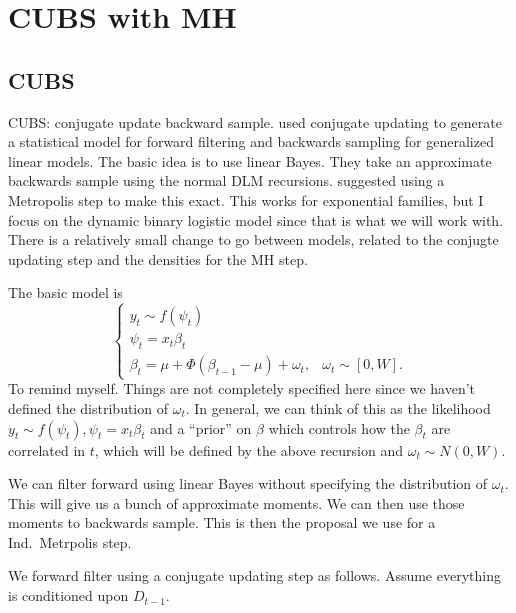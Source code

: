 \documentclass{article}
\begin{document}
\section{CUBS with MH}

\subsection{CUBS}

CUBS: conjugate update backward sample.  \cite{west-etal-1985} used conjugate
updating to generate a statistical model for forward filtering and backwards
sampling for generalized linear models.  The basic idea is to use linear Bayes.
They take an approximate backwards sample using the normal DLM recursions.
\cite{ravines-etal-2006} suggested using a Metropolis step to make this exact.
This works for exponential families, but I focus on the dynamic binary logistic
model since that is what we will work with.  There is a relatively small change
to go between models, related to the conjugte updating step and the densities
for the MH step.

The basic model is
\[
\begin{cases}
y_t \sim f(\psi_t) \\
\psi_t = x_t \beta_t \\
\beta_t = \mu + \Phi( \beta_{t-1} - \mu ) + \omega_t, & \omega_t \sim [0, W].
\end{cases}
\]
To remind myself.  Things are not completely specified here since we haven't
defined the distribution of $\omega_t$.  In general, we can think of this as the
likelihood $y_t \sim f(\psi_t), \psi_t = x_t \beta_t$ and a ``prior'' on $\beta$
which controls how the $\beta_t$ are correlated in $t$, which will be defined by
the above recursion and $\omega_t \sim N(0, W)$.

We can filter forward using linear Bayes without specifying the distribution of
$\omega_t$.  This will give us a bunch of approximate moments.  We can then use
those moments to backwards sample.  This is then the proposal we use for a
Ind.\ Metrpolis step.

We forward filter using a conjugate updating step as follows.  Assume everything
is conditioned upon $D_{t-1}$.
\end{document}
